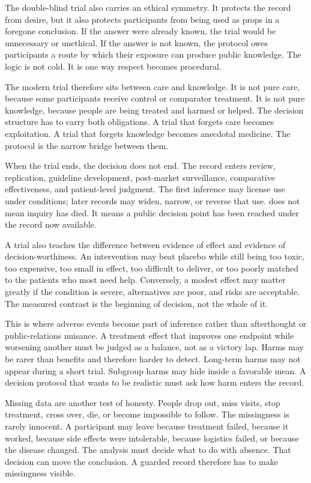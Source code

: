 The double-blind trial also carries an ethical symmetry. It protects the
record from desire, but it also protects participants from being used as
props in a foregone conclusion. If the answer were already known, the trial
would be unnecessary or unethical. If the answer is not known, the protocol
owes participants a route by which their exposure can produce public
knowledge. The logic is not cold. It is one way respect becomes procedural.

The modern trial therefore sits between care and knowledge. It is not pure
care, because some participants receive control or comparator treatment. It
is not pure knowledge, because people are being treated and harmed or helped.
The decision structure has to carry both obligations. A trial that forgets
care becomes exploitation. A trial that forgets knowledge becomes anecdotal
medicine. The protocol is the narrow bridge between them.

When the trial ends, the decision does not end. The record enters review,
replication, guideline development, post-market surveillance, comparative
effectiveness, and patient-level judgment. The first inference may license
use under conditions; later records may widen, narrow, or reverse that use.
 does not mean inquiry has died. It means a public decision point
has been reached under the record now available.

A trial also teaches the difference between evidence of effect and evidence
of decision-worthiness. An intervention may beat placebo while still being
too toxic, too expensive, too small in effect, too difficult to deliver, or
too poorly matched to the patients who most need help. Conversely, a modest
effect may matter greatly if the condition is severe, alternatives are poor,
and risks are acceptable. The measured contrast is the beginning of decision,
not the whole of it.

This is where adverse events become part of inference rather than afterthought
or public-relations nuisance. A treatment effect that improves one endpoint
while worsening another must be judged as a balance, not as a victory lap.
Harms may be rarer than benefits and therefore harder to detect. Long-term
harms may not appear during a short trial. Subgroup harms may hide inside a
favorable mean. A decision protocol that wants to be realistic must ask how
harm enters the record.

Missing data are another test of honesty. People drop out, miss visits, stop
treatment, cross over, die, or become impossible to follow. The missingness is
rarely innocent. A participant may leave because treatment failed, because it
worked, because side effects were intolerable, because logistics failed, or
because the disease changed. The analysis must decide what to do with absence.
That decision can move the conclusion. A guarded record therefore has to make
missingness visible.

